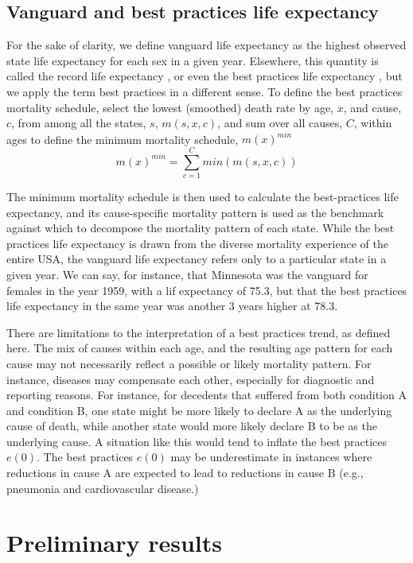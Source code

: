 \documentclass[11pt,oneside,a4paper]{article} %
\begin{document}
\subsection{Vanguard and best practices life expectancy}
For the sake of clarity, we define vanguard life expectancy as the highest
observed state life expectancy for each sex in a given year. Elsewhere, this
quantity is called the record life expectancy \citep{oeppen2002broken}, or even
the best practices life expectancy \citep{sanderson2004putting}, but we apply
the term best practices in a different sense. To define the best practices
mortality schedule, select the lowest (smoothed) death rate by age, $x$,
and cause, $c$, from among all the states, $s$, $m(s,x,c)$, and sum over
all causes, $C$, within ages to define the minimum mortality schedule,
$m(x)^{min}$
\begin{equation}
m(x)^{min} = \sum _{c=1}^C min(m(s,x,c))
\end{equation}

The minimum mortality schedule is then used to calculate the best-practices life
expectancy, and its cause-specific mortality pattern is used as the
benchmark against which to decompose the mortality pattern of each state. While
the best practices life expectancy is drawn from the diverse mortality
experience of the entire USA, the vanguard life expectancy refers only to a
particular state in a given year. We can say, for instance, that Minnesota was
the vanguard for females in the year 1959, with a lif expectancy of 75.3, but
that the best practices life expectancy in the same year was another 3 years
higher at 78.3.

There are limitations to the interpretation of a best practices trend, as
defined here. The mix of causes within each age, and the resulting age pattern
for each cause may not necessarily reflect a possible or likely mortality
pattern. For instance, diseases may compensate each other, especially for
diagnostic and reporting reasons. For instance, for decedents that suffered
from both condition A and condition B, one state might be more likely to
declare A as the underlying cause of death, while another state would more
likely declare B to be as the underlying cause. A situation like this
would tend to inflate the best practices $e(0)$. The best practices $e(0)$ may
be underestimate in instances where reductions in cause A are expected to lead
to reductions in cause B (e.g., pneumonia and cardiovascular disease.)
\FloatBarrier
\section*{Preliminary results}
\FloatBarrier
\end{document}

